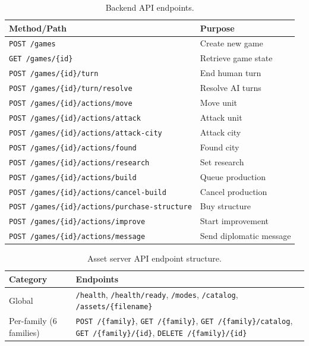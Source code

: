\documentclass[conference]{IEEEtran}
\begin{document}
\begin{table}[h]
\centering
\caption{Backend API endpoints.}
\label{tab:api_backend}
\begin{tabular}{@{}p{3cm}p{3.5cm}@{}}
\toprule
\textbf{Method/Path} & \textbf{Purpose} \\
\midrule
\texttt{POST /games} & Create new game \\
\texttt{GET /games/\{id\}} & Retrieve game state \\
\texttt{POST /games/\{id\}/turn} & End human turn \\
\texttt{POST /games/\{id\}/turn/resolve} & Resolve AI turns \\
\texttt{POST /games/\{id\}/actions/move} & Move unit \\
\texttt{POST /games/\{id\}/actions/attack} & Attack unit \\
\texttt{POST /games/\{id\}/actions/attack-city} & Attack city \\
\texttt{POST /games/\{id\}/actions/found} & Found city \\
\texttt{POST /games/\{id\}/actions/research} & Set research \\
\texttt{POST /games/\{id\}/actions/build} & Queue production \\
\texttt{POST /games/\{id\}/actions/cancel-build} & Cancel production \\
\texttt{POST /games/\{id\}/actions/purchase-structure} & Buy structure \\
\texttt{POST /games/\{id\}/actions/improve} & Start improvement \\
\texttt{POST /games/\{id\}/actions/message} & Send diplomatic message \\
\bottomrule
\end{tabular}
\end{table}

\begin{table}[h]
\centering
\caption{Asset server API endpoint structure.}
\label{tab:api_assets}
\begin{tabular}{@{}p{3cm}p{3.5cm}@{}}
\toprule
\textbf{Category} & \textbf{Endpoints} \\
\midrule
Global & \texttt{/health}, \texttt{/health/ready}, \texttt{/modes}, \texttt{/catalog}, \texttt{/assets/\{filename\}} \\
Per-family (6 families) & \texttt{POST /\{family\}}, \texttt{GET /\{family\}}, \texttt{GET /\{family\}/catalog}, \texttt{GET /\{family\}/\{id\}}, \texttt{DELETE /\{family\}/\{id\}} \\
\bottomrule
\end{tabular}
\end{table}
\end{document}
